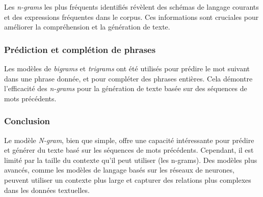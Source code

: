 Les \textit{n-grams} les plus fréquents identifiés révèlent des schémas de langage courants et des expressions fréquentes dans le corpus. Ces informations sont cruciales pour améliorer la compréhension et la génération de texte.

\subsubsection{Prédiction et complétion de phrases}

Les modèles de \textit{bigrams} et \textit{trigrams} ont été utilisés pour prédire le mot suivant dans une phrase donnée, et pour compléter des phrases entières. Cela démontre l'efficacité des \textit{n-grams} pour la génération de texte basée sur des séquences de mots précédents.



\subsubsection{Conclusion}

Le modèle \textit{N-gram}, bien que simple, offre une capacité intéressante pour prédire et générer du texte basé sur les séquences de mots précédents. Cependant, il est limité par la taille du contexte qu'il peut utiliser (les {n-grams}). Des modèles plus avancés, comme les modèles de langage basés sur les réseaux de neurones, peuvent utiliser un contexte plus large et capturer des relations plus complexes dans les données textuelles.